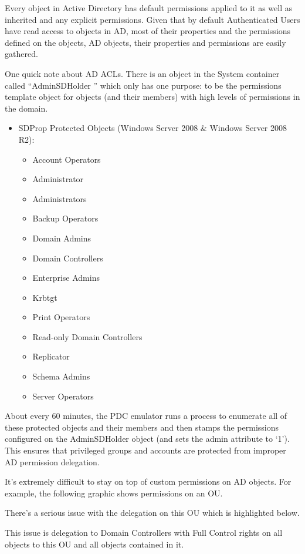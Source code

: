 Every object in Active Directory has default permissions applied to it as well as inherited and any explicit permissions. Given that by default Authenticated Users have read access to objects in AD, most of their properties and the permissions defined on the objects, AD objects, their properties and permissions are easily gathered.

One quick note about AD ACLs. There is an object in the System container called “AdminSDHolder ” which only has one purpose: to be the permissions template object for objects (and their members) with high levels of permissions in the domain.

\begin{itemize}
    \item SDProp Protected Objects (Windows Server 2008 \& Windows Server 2008 R2):
    \begin{itemize}
        \item Account Operators
        \item Administrator
        \item Administrators
        \item Backup Operators
        \item Domain Admins
        \item Domain Controllers
        \item Enterprise Admins
        \item Krbtgt
        \item Print Operators
        \item Read-only Domain Controllers
        \item Replicator
        \item Schema Admins
        \item Server Operators
    \end{itemize}
\end{itemize}
About every 60 minutes, the PDC emulator runs a process to enumerate all of these protected objects and their members and then stamps the permissions configured on the AdminSDHolder object (and sets the admin attribute to ‘1’). This ensures that privileged groups and accounts are protected from improper AD permission delegation.

It’s extremely difficult to stay on top of custom permissions on AD objects. For example, the following graphic shows permissions on an OU.

There’s a serious issue with the delegation on this OU which is highlighted below.

This issue is delegation to Domain Controllers with Full Control rights on all objects to this OU and all objects contained in it.

